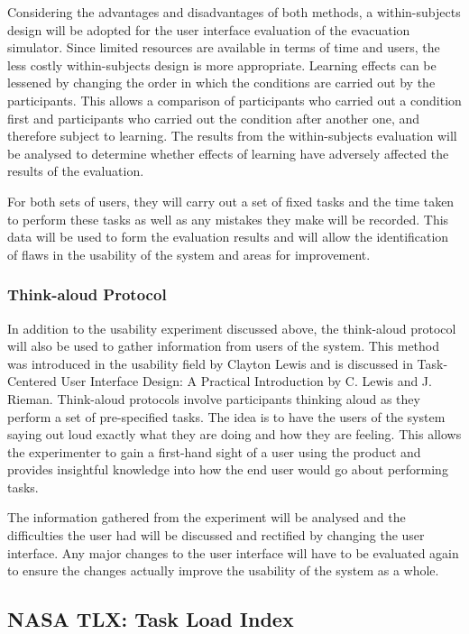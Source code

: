 Considering the advantages and disadvantages of both methods, a within-subjects design will be adopted for the user interface evaluation of the evacuation simulator. Since limited resources are available in terms of time and users, the less costly within-subjects design is more appropriate. Learning effects can be lessened by changing the order in which the conditions are carried out by the participants. This allows a comparison of participants who carried out a condition first and participants who carried out the condition after another one, and therefore subject to learning. The results from the within-subjects evaluation will be analysed to determine whether effects of learning have adversely affected the results of the evaluation.

For both sets of users, they will carry out a set of fixed tasks and the time taken to perform these tasks as well as any mistakes they make will be recorded. This data will be used to form the evaluation results and will allow the identification of flaws in the usability of the system and areas for improvement.

\subsubsection{Think-aloud Protocol}
In addition to the usability experiment discussed above, the think-aloud protocol will also be used to gather information from users of the system. This method was introduced in the usability field by Clayton Lewis and is discussed in Task-Centered User Interface Design: A Practical Introduction by C. Lewis and J. Rieman\cite{uidesign}. Think-aloud protocols involve participants thinking aloud as they perform a set of pre-specified tasks. The idea is to have the users of the system saying out loud exactly what they are doing and how they are feeling. This allows the experimenter to gain a first-hand sight of a user using the product and provides insightful knowledge into how the end user would go about performing tasks.

The information gathered from the experiment will be analysed and the difficulties the user had will be discussed and rectified by changing the user interface. Any major changes to the user interface will have to be evaluated again to ensure the changes actually improve the usability of the system as a whole. 

\subsection{NASA TLX: Task Load Index}

